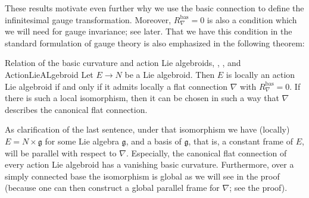 These results motivate even further why we use the basic connection to define the infinitesimal gauge transformation. Moreover, $R^{\mathrm{bas}}_\nabla=0$ is also a condition which we will need for gauge invariance; see later. That we have this condition in the standard formulation of gauge theory is also emphasized in the following theorem:

\begin{theorems}{Relation of the basic curvature and action Lie algebroids, \newline \cite[discussion around Eq.~(9)]{CurvedYMH}, \cite[Prop.~2.12]{basicconn}, and \cite[\S 2.5, Theorem A]{blaomTangentBundleAsLieGroup}}{ActionLieALgebroid}
Let $E \to N$ be a Lie algebroid. Then $E$ is locally an action Lie algebroid if and only if it admits locally a flat connection $\nabla$ with $R_\nabla^{\mathrm{bas}} = 0$. If there is such a local isomorphism, then it can be chosen in such a way that $\nabla$ describes the canonical flat connection.
\end{theorems}

\begin{remark}\label{remSimplyConnectedEqualsGlobal}
\leavevmode\newline
As clarification of the last sentence, under that isomorphism we have (locally) $E = N \times \mathfrak{g}$ for some Lie algebra $\mathfrak{g}$, and a basis of $\mathfrak{g}$, that is, a constant frame of $E$, will be parallel with respect to $\nabla$. Especially, the canonical flat connection of every action Lie algebroid has a vanishing basic curvature. Furthermore, over a simply connected base the isomorphism is global as we will see in the proof (because one can then construct a global parallel frame for $\nabla$; see the proof).
\end{remark}

